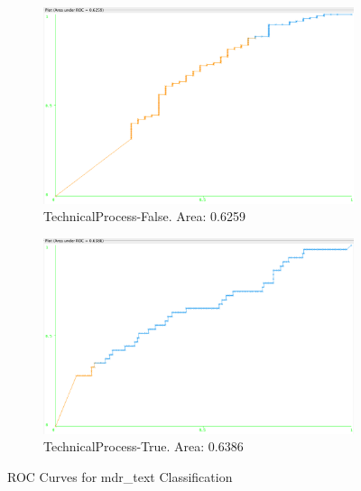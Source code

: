 \documentclass[11pt, notitlepage,abstracton,oneside]{article}   	%
\begin{document}
\begin{figure}[H]
    \ContinuedFloat

    \begin{subfigure}[b]{0.45\textwidth}
        \centering
        \includegraphics[width=\textwidth]{figures/approach2/TechnicalProcess-False(0)}
        \caption{TechnicalProcess-False. Area: 0.6259}
        \label{fig:TechnicalProcess-False(0)}
    \end{subfigure}
    \hfill
    \begin{subfigure}[b]{0.45\textwidth}
        \centering
        \includegraphics[width=\textwidth]{figures/approach2/TechnicalProcess-True(1)}
        \caption{TechnicalProcess-True. Area: 0.6386}
        \label{fig:TechnicalProcess-True(1)}
    \end{subfigure}
    \hfill

    \caption{ROC Curves for mdr\_text Classification}
    \label{fig:Approach 2 ROC Curves}
\end{figure}
\end{document}
